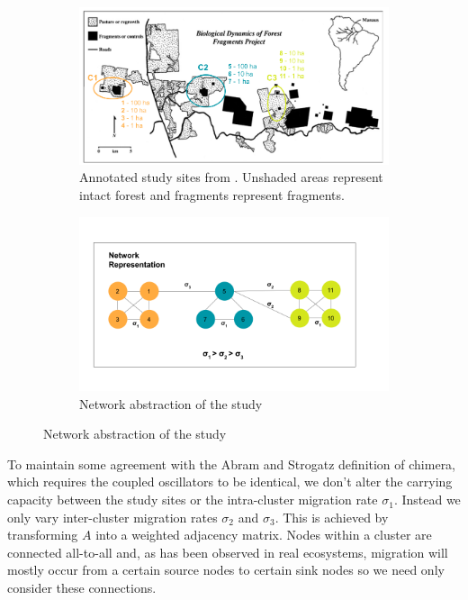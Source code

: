 \documentclass[12pt]{article}
\begin{document}
\begin{figure}[H]
    \begin{subfigure}[b]{\linewidth}
    \centering
    \includegraphics[width = \textwidth]{Claire Section/study_sites.png}
    \caption{Annotated study sites from \cite{laurance2011}. Unshaded areas represent intact forest and fragments represent fragments.}
    \end{subfigure}
    \hfill
    \begin{subfigure}[b]{\linewidth}
    \centering
    \includegraphics[width = \textwidth]{Claire Section/network_version.png}
    \caption{Network abstraction of the study}
    \end{subfigure}
    \label{fig: case study intro}
\end{figure}
\noindent To maintain some agreement with the Abram and Strogatz definition of chimera, which requires the coupled oscillators to be identical, we don't alter the carrying capacity between the study sites or the intra-cluster migration rate $\sigma_1$. Instead we only vary inter-cluster migration rates $\sigma_2$ and $\sigma_3$. This is achieved by transforming $A$ into a weighted adjacency matrix. Nodes within a cluster are connected all-to-all and, as has been observed in real ecosystems, \cite{hagen2012biodiversity} migration will mostly occur from a certain source nodes to certain sink nodes so we need only consider these connections.
\end{document}
